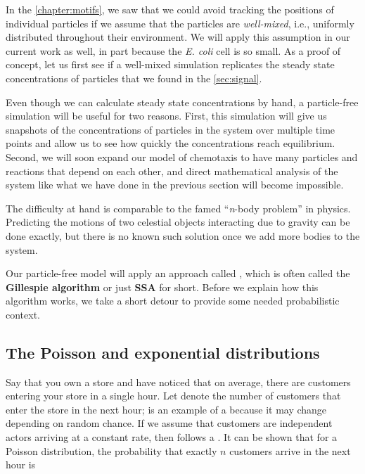 In the \autoref{chapter:motifs}, we saw that we could avoid tracking the positions of individual particles if we assume that the particles are \textit{well-mixed}, i.e., uniformly distributed throughout their environment. We will apply this assumption in our current work as well, in part because the \textit{E. coli} cell is so small. As a proof of concept, let us first see if a well-mixed simulation replicates the steady state concentrations of particles that we found in the \autoref{sec:signal}.

Even though we can calculate steady state concentrations by hand, a particle-free simulation will be useful for two reasons. First, this simulation will give us snapshots of the concentrations of particles in the system over multiple time points and allow us to see how quickly the concentrations reach equilibrium. Second, we will soon expand our model of chemotaxis to have many particles and reactions that depend on each other, and direct mathematical analysis of the system like what we have done in the previous section will become impossible.

The difficulty at hand is comparable to the famed ``\textit{n}-body problem'' in physics. Predicting the motions of two celestial objects interacting due to gravity can be done exactly, but there is no known such solution once we add more bodies to the system.

Our particle-free model will apply an approach called , which is often called the \textbf{Gillespie algorithm} or just \textbf{SSA} for short. Before we explain how this algorithm works, we take a short detour to provide some needed probabilistic context.

\FloatBarrier
{}
\subsection{The Poisson and exponential distributions}

Say that you own a store and have noticed that on average, there are  customers entering your store in a single hour. Let  denote the number of customers that enter the store in the next hour;  is an example of a  because it may change depending on random chance. If we assume that customers are independent actors arriving at a constant rate, then  follows a . It can be shown that for a Poisson distribution, the probability that exactly $n$ customers arrive in the next hour is

